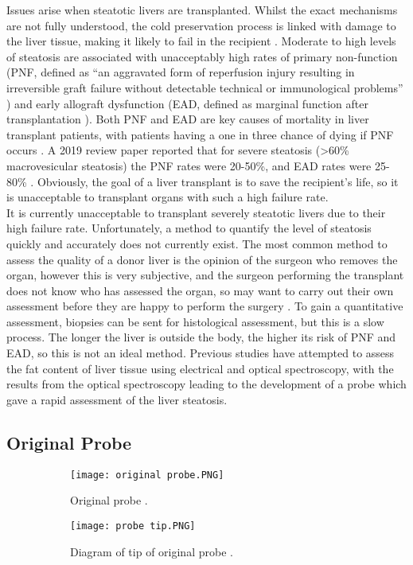 Issues arise when steatotic livers are transplanted. Whilst the exact mechanisms are not fully understood, the cold preservation process is linked with damage to the liver tissue, making it likely to fail in the recipient \cite{Imber2002}. Moderate to high levels of steatosis are associated with unacceptably high rates of primary non-function (PNF, defined as “an aggravated form of reperfusion injury resulting in irreversible graft failure without detectable technical or immunological problems” \cite{Lock2010}) and early allograft dysfunction (EAD, defined as marginal function after transplantation \cite{Deschenes2013}). Both PNF and EAD are key causes of mortality in liver transplant patients, with patients having a one in three chance of dying if PNF occurs \cite{Robertson}. A 2019 review paper reported that for severe steatosis (\textgreater60\% macrovesicular steatosis) the PNF rates were 20-50\%, and EAD rates were 25-80\% \cite{Linares2019}. Obviously, the goal of a liver transplant is to save the recipient’s life, so it is unacceptable to transplant organs with such a high failure rate.\\

It is currently unacceptable to transplant severely steatotic livers due to their high failure rate. Unfortunately, a method to quantify the level of steatosis quickly and accurately does not currently exist. The most common method to assess the quality of a donor liver is the opinion of the surgeon who removes the organ, however this is very subjective, and the surgeon performing the transplant does not know who has assessed the organ, so may want to carry out their own assessment before they are happy to perform the surgery \cite{Robertson}. To gain a quantitative assessment, biopsies can be sent for histological assessment, but this is a slow process. The longer the liver is outside the body, the higher its risk of PNF and EAD, so this is not an ideal method. Previous studies \cite{McLaughlin2010} have attempted to assess the fat content of liver tissue using electrical and optical spectroscopy, with the results from the optical spectroscopy leading to the development of a probe \cite{Robertson} which gave a rapid assessment of the liver steatosis. \\


\subsection{Original Probe}

\begin{figure}[htbp]
	\centering
	\begin{subfigure}[b]{0.4\linewidth}
		\texttt{[image: original probe.PNG]}
		\caption{Original probe \cite{Robertson}.}
		\label{fig: original probe}
	\end{subfigure}
	\begin{subfigure}[b]{0.4\linewidth}
		\texttt{[image: probe tip.PNG]}
		\caption{Diagram of tip of original probe \cite{Robertson}.}
		\label{fig: probe tip}
	\end{subfigure}
	\caption{}
\end{figure}

